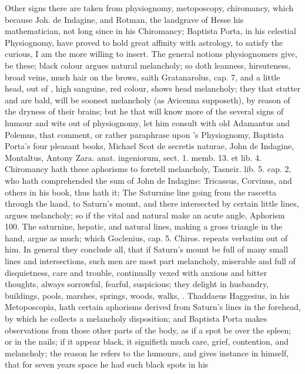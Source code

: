 {{Other signs there are taken from physiognomy, metoposcopy, chiromancy,
which because Joh. de Indagine, and Rotman, the landgrave of Hesse his
mathematician, not long since in his Chiromancy; Baptista Porta, in his
celestial Physiognomy, have proved to hold great affinity with
astrology, to satisfy the curious, I am the more willing to insert.
The general notions physiognomers give, be these; black colour
argues natural melancholy; so doth leanness, hirsuteness, broad veins,
much hair on the brows, saith Gratanarolus, cap. 7, and a little
head, out of \Aristotle, high sanguine, red colour, shows head
melancholy; they that stutter and are bald, will be soonest melancholy (as Avicenna supposeth), by reason of the dryness of their brains; but
he that will know more of the several signs of humour and wits out of
physiognomy, let him consult with old Adamantus and Polemus, that
comment, or rather paraphrase upon \Aristotle's Physiognomy, Baptista
Porta's four pleasant books, Michael Scot de secretis naturae, John de
Indagine, Montaltus, Antony Zara. anat. ingeniorum, sect. 1. memb. 13.
et lib. 4. Chiromancy hath these aphorisms to foretell melancholy, Tasneir. lib.
5. cap. 2, who hath comprehended the sum of John de Indagine:
Tricassus, Corvinus, and others in his book, thus hath it; The
Saturnine line going from the rascetta through the hand, to Saturn's
mount, and there intersected by certain little lines, argues
melancholy; so if the vital and natural make an acute angle, Aphorism
100. The saturnine, hepatic, and natural lines, making a gross triangle
in the hand, argue as much; which Goclenius, cap. 5. Chiros. repeats
verbatim out of him. In general they conclude all, that if Saturn's
mount be full of many small lines and intersections, such men are
most part melancholy, miserable and full of disquietness, care and
trouble, continually vexed with anxious and bitter thoughts, always
sorrowful, fearful, suspicious; they delight in husbandry, buildings,
pools, marshes, springs, woods, walks, \etc{}. Thaddaeus Haggesius, in his
Metoposcopia, hath certain aphorisms derived from Saturn's lines in the
forehead, by which he collects a melancholy disposition; and
Baptista Porta makes observations from those other parts of the
body, as if a spot be over the spleen; or in the nails; if it
appear black, it signifieth much care, grief, contention, and
melancholy; the reason he refers to the humours, and gives instance in
himself, that for seven years space he had such black spots in his
}}
